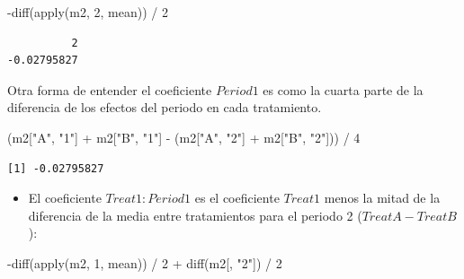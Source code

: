 \documentclass[
  12pt,
  a4paper,
  extrafontsizes,
  onecolumn,
  openright]{memoir}
\newenvironment{Shaded}{\begin{snugshade}}{\end{snugshade}}
\newcommand{\DecValTok}[1]{\textcolor[rgb]{0.68,0.00,0.00}{#1}}
\newcommand{\FunctionTok}[1]{\textcolor[rgb]{0.28,0.35,0.67}{#1}}
\newcommand{\NormalTok}[1]{\textcolor[rgb]{0.00,0.23,0.31}{#1}}
\newcommand{\SpecialCharTok}[1]{\textcolor[rgb]{0.37,0.37,0.37}{#1}}
\newcommand{\StringTok}[1]{\textcolor[rgb]{0.13,0.47,0.30}{#1}}
\providecommand{\tightlist}{%
  \setlength{\itemsep}{0pt}\setlength{\parskip}{0pt}}\usepackage{longtable,booktabs,array}
\begin{document}
\scriptsize

\begin{Shaded}
\begin{Highlighting}[]
\SpecialCharTok{{-}}\FunctionTok{diff}\NormalTok{(}\FunctionTok{apply}\NormalTok{(m2, }\DecValTok{2}\NormalTok{, mean)) }\SpecialCharTok{/} \DecValTok{2}
\end{Highlighting}
\end{Shaded}

\begin{verbatim}
          2 
-0.02795827 
\end{verbatim}

\normalsize

Otra forma de entender el coeficiente \(Period1\) es como la cuarta
parte de la diferencia de los efectos del periodo en cada tratamiento.

\scriptsize

\begin{Shaded}
\begin{Highlighting}[]
\NormalTok{(m2[}\StringTok{"A"}\NormalTok{, }\StringTok{"1"}\NormalTok{] }\SpecialCharTok{+}\NormalTok{ m2[}\StringTok{"B"}\NormalTok{, }\StringTok{"1"}\NormalTok{] }\SpecialCharTok{{-}}\NormalTok{ (m2[}\StringTok{"A"}\NormalTok{, }\StringTok{"2"}\NormalTok{] }\SpecialCharTok{+}\NormalTok{ m2[}\StringTok{"B"}\NormalTok{, }\StringTok{"2"}\NormalTok{])) }\SpecialCharTok{/} \DecValTok{4}
\end{Highlighting}
\end{Shaded}

\begin{verbatim}
[1] -0.02795827
\end{verbatim}

\normalsize

\begin{itemize}
\tightlist
\item
  El coeficiente \(Treat1:Period1\) es el coeficiente \(Treat1\) menos
  la mitad de la diferencia de la media entre tratamientos para el
  periodo 2 (\(TreatA-TreatB\)):
\end{itemize}

\scriptsize

\begin{Shaded}
\begin{Highlighting}[]
\SpecialCharTok{{-}}\FunctionTok{diff}\NormalTok{(}\FunctionTok{apply}\NormalTok{(m2, }\DecValTok{1}\NormalTok{, mean)) }\SpecialCharTok{/} \DecValTok{2} \SpecialCharTok{+} \FunctionTok{diff}\NormalTok{(m2[, }\StringTok{"2"}\NormalTok{]) }\SpecialCharTok{/} \DecValTok{2}
\end{Highlighting}
\end{Shaded}
\end{document}
